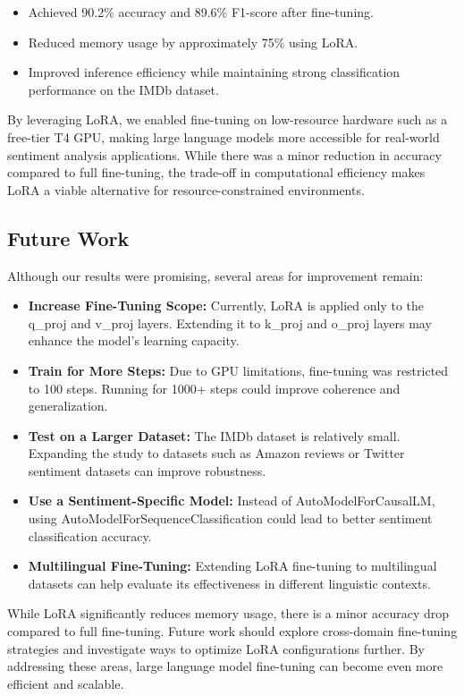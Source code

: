 \documentclass{article} %
\begin{document}
\begin{flushleft}
\begin{itemize}
    \item Achieved 90.2\% accuracy and 89.6\% F1-score after fine-tuning.
    \item Reduced memory usage by approximately 75\% using LoRA.
    \item Improved inference efficiency while maintaining strong classification performance on the IMDb dataset.
\end{itemize}

By leveraging LoRA, we enabled fine-tuning on low-resource hardware such as a free-tier T4 GPU, making large language models more accessible for real-world sentiment analysis applications. While there was a minor reduction in accuracy compared to full fine-tuning, the trade-off in computational efficiency makes LoRA a viable alternative for resource-constrained environments.

\subsection{Future Work}
Although our results were promising, several areas for improvement remain:

\begin{itemize}
    \item \textbf{Increase Fine-Tuning Scope:} Currently, LoRA is applied only to the q\_proj and v\_proj layers. Extending it to k\_proj and o\_proj layers may enhance the model’s learning capacity.
    \item \textbf{Train for More Steps:} Due to GPU limitations, fine-tuning was restricted to 100 steps. Running for 1000+ steps could improve coherence and generalization.
    \item \textbf{Test on a Larger Dataset:} The IMDb dataset is relatively small. Expanding the study to datasets such as Amazon reviews or Twitter sentiment datasets can improve robustness.
    \item \textbf{Use a Sentiment-Specific Model:} Instead of AutoModelForCausalLM, using AutoModelForSequenceClassification could lead to better sentiment classification accuracy.
    \item \textbf{Multilingual Fine-Tuning:} Extending LoRA fine-tuning to multilingual datasets can help evaluate its effectiveness in different linguistic contexts.
\end{itemize}

While LoRA significantly reduces memory usage, there is a minor accuracy drop compared to full fine-tuning. Future work should explore cross-domain fine-tuning strategies and investigate ways to optimize LoRA configurations further. By addressing these areas, large language model fine-tuning can become even more efficient and scalable.


\noindent 

\noindent 
\end{flushleft}
\end{document}
